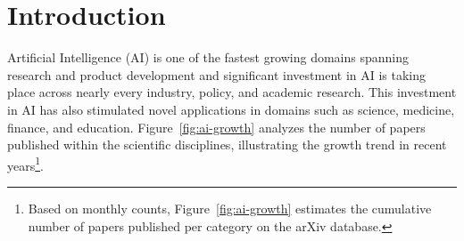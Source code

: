 \section{Introduction}
\label{sec:introduction}

Artificial Intelligence (AI) is one of the fastest growing domains spanning research and product development and significant investment in AI is taking place across nearly every industry, policy, and academic research. This investment in AI has also stimulated novel applications in domains such as science, medicine, finance, and education. Figure~\ref{fig:ai-growth} analyzes the number of papers published within the scientific disciplines, illustrating the growth trend in recent years\footnote{Based on monthly counts, Figure~\ref{fig:ai-growth} estimates the cumulative number of papers published per category on the arXiv database.}.


